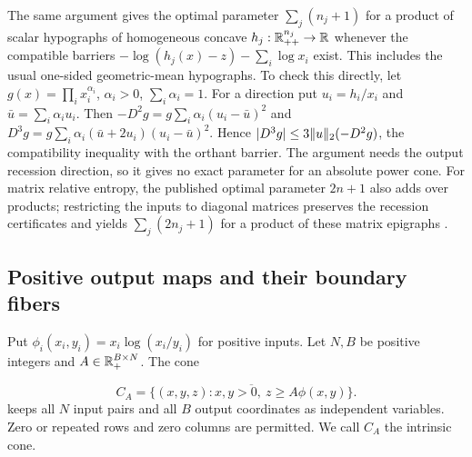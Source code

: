 The same argument gives the optimal parameter $\sum_j(n_j+1)$ for a
product of scalar
hypographs of homogeneous concave $h_j:\mathbb R_{++}^{n_j}\to\mathbb R$ whenever
the compatible barriers
$-\log(h_j(x)-z)-\sum_i\log x_i$ exist.  This includes the usual
one-sided geometric-mean hypographs.  To check this directly, let $g(x)=\prod_i x_i^{\alpha_i}$, $\alpha_i>0$, $\sum_i\alpha_i=1$.
For a direction put $u_i=h_i/x_i$ and $\bar u=\sum_i\alpha_i u_i$.
Then $-D^2g=g\sum_i\alpha_i(u_i-\bar u)^2$ and
$D^3g=g\sum_i\alpha_i(\bar u+2u_i)(u_i-\bar u)^2$.
Hence $|D^3g|\leq3\lVert u\rVert_2(-D^2g)$, the compatibility inequality
with the orthant barrier.  The argument needs the output recession
direction, so it gives no exact parameter for an absolute power
cone.  For matrix relative entropy, the published optimal parameter
$2n+1$ also adds over products; restricting the inputs to diagonal matrices
preserves the recession certificates and yields $\sum_j(2n_j+1)$ for a
product of these matrix epigraphs \citep{FS2023}.

\subsection{Positive output maps and their boundary fibers}

Put $\phi_i(x_i,y_i)=x_i\log(x_i/y_i)$ for positive inputs.  Let $N,B$
be positive integers and $A\in\mathbb R_+^{B\times N}$.  The cone

\begin{equation}\label{eq:entropy-aggregate-cone}
 C_A=\overline{\{(x,y,z):x,y>0,\ z\geq A\phi(x,y)\}}.
\end{equation}
keeps all $N$ input pairs and all $B$ output coordinates as independent
variables.  Zero or repeated rows and zero columns are permitted.  We
call $C_A$ the intrinsic cone.

